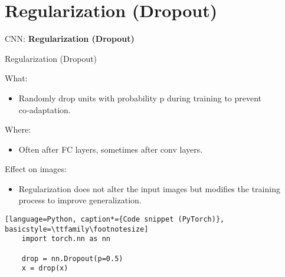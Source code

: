 \section{Regularization (Dropout)}
\begin{frame}{}
    \LARGE CNN: \textbf{Regularization (Dropout)}
\end{frame}

\begin{frame}[fragile]{Regularization (Dropout)}
    \begin{block}{What:}
        \begin{itemize}
            \item Randomly drop units with probability p during training to prevent co‑adaptation.
        \end{itemize}
    \end{block}

    \begin{block}{Where:}
        \begin{itemize}
            \item Often after FC layers, sometimes after conv layers.
        \end{itemize}
    \end{block}

    \begin{block}{Effect on images:}
        \begin{itemize}
            \item Regularization does not alter the input images but modifies the training process to improve generalization. 
        \end{itemize}
    \end{block}

    \begin{lstlisting}[language=Python, caption*={Code snippet (PyTorch)}, basicstyle=\ttfamily\footnotesize]
    import torch.nn as nn

    drop = nn.Dropout(p=0.5)
    x = drop(x)
    \end{lstlisting}
\end{frame}  